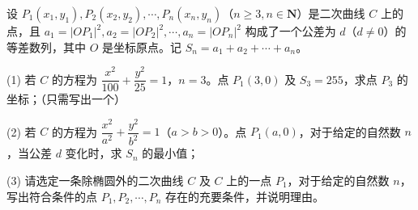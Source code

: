 \begin{question}
设 $P_1(x_1, y_1), P_2(x_2, y_2), \cdots, P_n(x_n, y_n)$（$n \geqslant 3, n \in \mathbf{N}$）是二次曲线 $C$ 上的点，且 $a_1 = |OP_1|^2, a_2 = |OP_2|^2, \cdots, a_n = |OP_n|^2$ 构成了一个公差为 $d$（$d \ne 0$）的等差数列，其中 $O$ 是坐标原点。记 $S_n = a_1 + a_2 + \cdots + a_n$。

(1) 若 $C$ 的方程为 $\dfrac{x^2}{100} + \dfrac{y^2}{25} = 1$，$n = 3$。点 $P_1(3, 0)$ 及 $S_3 = 255$，求点 $P_3$ 的坐标；（只需写出一个）

(2) 若 $C$ 的方程为 $\dfrac{x^2}{a^2} + \dfrac{y^2}{b^2} = 1$（$a > b > 0$）。点 $P_1(a, 0)$，对于给定的自然数 $n$，当公差 $d$ 变化时，求 $S_n$ 的最小值；

(3) 请选定一条除椭圆外的二次曲线 $C$ 及 $C$ 上的一点 $P_1$，对于给定的自然数 $n$，写出符合条件的点 $P_1, P_2, \cdots, P_n$ 存在的充要条件，并说明理由。

\end{question}